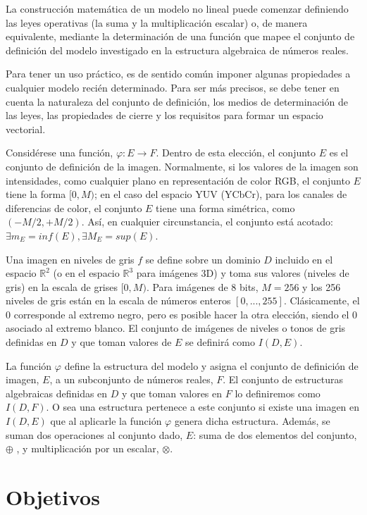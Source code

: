La construcción matemática de un modelo no lineal puede comenzar definiendo las leyes operativas (la suma y la multiplicación escalar) o, de manera equivalente, mediante la determinación de una función que mapee el conjunto de definición del modelo investigado en la estructura algebraica de números reales.

Para tener un uso práctico, es de sentido común imponer algunas propiedades a cualquier modelo recién determinado. Para ser más precisos, se debe tener en cuenta la naturaleza del conjunto de definición, los medios de determinación de las leyes, las propiedades de cierre y los requisitos para formar un espacio vectorial. 

Consid\'erese una función, $\varphi : E \rightarrow F$. Dentro de esta elección, el conjunto $E$ es el conjunto de definición de la imagen. Normalmente, si los valores de la imagen son intensidades, como cualquier plano en representación de color RGB, el conjunto $E$ tiene la forma $[0,M)$; en el caso del espacio YUV (YCbCr), para los canales de diferencias de color, el conjunto $E$ tiene una forma simétrica, como $( - M/2 , + M/2 )$. Así, en cualquier circunstancia, el conjunto está acotado: $\exists m_E=inf(E),\exists M_E=sup(E)$.

Una imagen en niveles de gris $f$ se define sobre un dominio $D$ incluido en el espacio $\mathbb{R}^2$ (o en el espacio $\mathbb{R}^3$  para imágenes 3D) y toma sus valores (niveles de gris) en la escala de grises $[0, M)$. Para imágenes de 8 bits, $ M = 256$ y los 256 niveles de gris están en la escala de números enteros $[0,..., 255]$. Clásicamente, el 0 corresponde al extremo negro, pero es posible hacer la otra elección, siendo el 0 asociado al extremo blanco. El conjunto de imágenes de niveles o tonos de gris definidas en $D$ y que toman valores de $E$ se definir\'a como $I(D,E)$.

La función $\varphi$ define la estructura del modelo y asigna el conjunto de definición de imagen, $E$, a un subconjunto de números reales, $F$. El conjunto de estructuras algebraicas definidas en $D$ y que toman valores en $F$ lo definiremos como $I(D,F)$. O sea una estructura pertenece a este conjunto si existe una imagen en $I(D,E)$ que al aplicarle la funci\'on $\varphi$ genera dicha estructura. Además, se suman dos operaciones al conjunto dado, $E$: suma de dos elementos del conjunto, $\oplus$ , y multiplicación por un escalar, $\otimes$.  

\section*{Objetivos}

